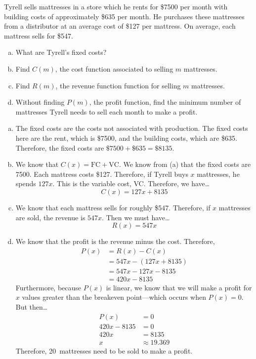 \documentclass[11pt,letterpaper]{article}
\begin{document}

 Tyrell sells mattresses in a store which he rents for \$7500 per month with building costs of approximately \$635 per month. He purchases these mattresses from a distributor at an average cost of \$127 per mattress. On average, each mattress sells for \$547.
        \begin{enumerate}[(a)]
        \item What are Tyrell's fixed costs?
        \item Find $C(m)$, the cost function associated to selling $m$ mattresses. 
        \item Find $R(m)$, the revenue function function for selling $m$ mattresses. 
        \item Without finding $P(m)$, the profit function, find the minimum number of mattresses Tyrell needs to sell each month to make a profit. 
        \end{enumerate} \pvspace{0.3cm}

\sol
\begin{enumerate}[(a)]
\item The fixed costs are the costs not associated with production. The fixed costs here are the rent, which is \$7500, and the building costs, which are \$635. Therefore, the fixed costs are $\$7500 + \$635= \$8135$. 

\item We know that $C(x)= \text{FC} + \text{VC}$. We know from (a) that the fixed costs are 7500. Each mattress costs \$127. Therefore, if Tyrell buys $x$ mattresses, he spends $127x$. This is the variable cost, VC. Therefore, we have\dots
	\[
	C(x)= 127x + 8135
	\]

\item We know that each mattress sells for roughly \$547. Therefore, if $x$ mattresses are sold, the revenue is $547x$. Then we must have\dots
	\[
	R(x)= 547x 
	\]

\item We know that the profit is the revenue minus the cost. Therefore,
	\[
	\begin{aligned}
	P(x)&= R(x) - C(x) \\[0.3cm]
	&= 547x - (127x + 8135) \\[0.3cm]
	&= 547x - 127x - 8135 \\[0.3cm]
	&= 420x - 8135
	\end{aligned}
	\]
Furthermore, because $P(x)$ is linear, we know that we will make a profit for $x$ values greater than the breakeven point---which occurs when $P(x)= 0$. But then\dots
	\[
	\begin{aligned}
	P(x)&= 0 \\[0.3cm]
	420x - 8135&= 0 \\[0.3cm]
	420x&= 8135 \\[0.3cm]
	x&\approx 19.369
	\end{aligned}
	\]
Therefore, 20~mattresses need to be sold to make a profit. 
\end{enumerate}
\end{document}
